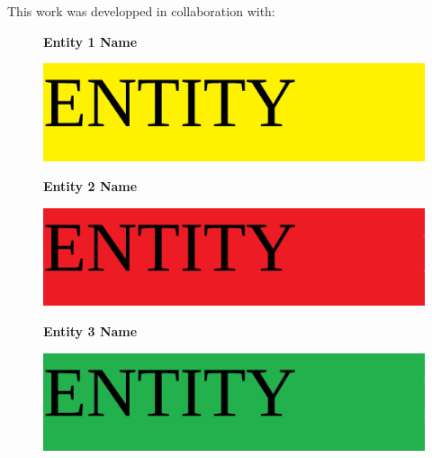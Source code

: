 
\thispagestyle{plain}

\centerline{This work was developped in collaboration with:}
\vspace{50pt}

\begin{figure}[H]
    \centering
    \textbf{Entity 1 Name}\par\medskip
    \includegraphics[scale=0.4]{../images/entities/entity1.jpg}
\end{figure}

\begin{figure}[H]
    \centering
    \textbf{Entity 2 Name}\par\medskip
    \includegraphics[scale=0.4]{../images/entities/entity2.jpg}
\end{figure}

\begin{figure}[H]
    \centering
    \textbf{Entity 3 Name}\par\medskip
    \includegraphics[scale=0.4]{../images/entities/entity3.jpg}
\end{figure}